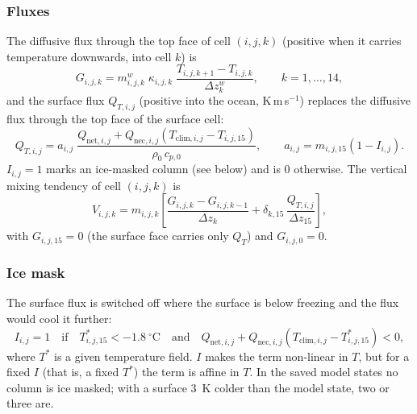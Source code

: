 \documentclass{article}
\begin{document}
\subsubsection*{Fluxes}
The diffusive flux through the top face of cell $(i,j,k)$ (positive when it carries temperature downwards, into cell $k$) is
\[
G_{i,j,k} = m^w_{i,j,k}\; \kappa_{i,j,k}\; \frac{T_{i,j,k+1} - T_{i,j,k}}{\Delta z^w_k}, \qquad k = 1,\dots,14,
\]
and the surface flux $Q_{T,i,j}$ (positive into the ocean, K\,m\,s$^{-1}$) replaces the diffusive flux through the top face of the surface cell:
\[
Q_{T,i,j} = a_{i,j}\; \frac{Q_{\text{net},i,j} + Q_{\text{nec},i,j}\left( T_{\text{clim},i,j} - T_{i,j,15} \right)}{\rho_0\, c_{p,0}},
\qquad
a_{i,j} = m_{i,j,15}\left( 1 - I_{i,j} \right).
\]
$I_{i,j} = 1$ marks an ice-masked column (see below) and is $0$ otherwise.
The vertical mixing tendency of cell $(i,j,k)$ is
\begin{equation}
V_{i,j,k} = m_{i,j,k} \left[ \frac{G_{i,j,k} - G_{i,j,k-1}}{\Delta z_k} + \delta_{k,15}\, \frac{Q_{T,i,j}}{\Delta z_{15}} \right],
\label{eq:vmix_discrete}
\end{equation}
with $G_{i,j,15} = 0$ (the surface face carries only $Q_T$) and $G_{i,j,0} = 0$.

\subsubsection*{Ice mask}
The surface flux is switched off where the surface is below freezing and the flux would cool it further:
\[
I_{i,j} = 1 \quad \text{if} \quad T^\ast_{i,j,15} < -1.8~^\circ\text{C} \quad \text{and} \quad Q_{\text{net},i,j} + Q_{\text{nec},i,j}\left( T_{\text{clim},i,j} - T^\ast_{i,j,15} \right) < 0,
\]
where $T^\ast$ is a given temperature field.
$I$ makes the term non-linear in $T$, but for a fixed $I$ (that is, a fixed $T^\ast$) the term is affine in $T$.
In the saved model states no column is ice masked; with a surface 3~K colder than the model state, two or three are.
\end{document}
